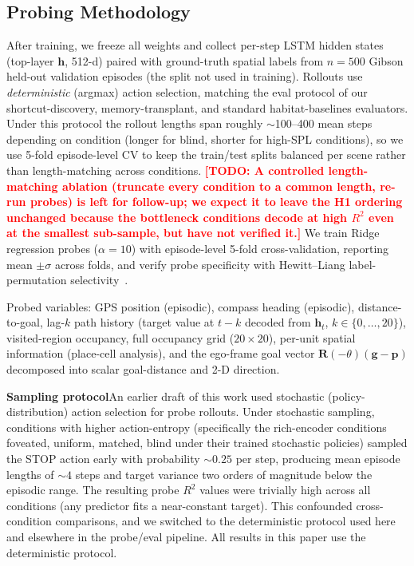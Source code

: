 \documentclass{article}
\newcommand{\TODO}[1]{\textcolor{red}{\textbf{[TODO: #1]}}}
\begin{document}
\subsection{Probing Methodology}
\label{sec:methods-probing}

After training, we freeze all weights and collect per-step LSTM hidden states (top-layer $\mathbf{h}$, 512-d) paired with ground-truth spatial labels from $n{=}500$ Gibson held-out validation episodes (the split not used in training). Rollouts use \emph{deterministic} (argmax) action selection, matching the eval protocol of our shortcut-discovery, memory-transplant, and standard habitat-baselines evaluators. Under this protocol the rollout lengths span roughly $\sim$100--400 mean steps depending on condition (longer for blind, shorter for high-SPL conditions), so we use 5-fold episode-level CV to keep the train/test splits balanced per scene rather than length-matching across conditions. \TODO{A controlled length-matching ablation (truncate every condition to a common length, re-run probes) is left for follow-up; we expect it to leave the H1 ordering unchanged because the bottleneck conditions decode at high $R^2$ even at the smallest sub-sample, but have not verified it.} We train Ridge regression probes ($\alpha=10$) with episode-level 5-fold cross-validation, reporting mean $\pm\sigma$ across folds, and verify probe specificity with Hewitt--Liang label-permutation selectivity~\citep{hewitt2019control}.

Probed variables: GPS position (episodic), compass heading (episodic), distance-to-goal, lag-$k$ path history (target value at $t-k$ decoded from $\mathbf{h}_t$, $k\in\{0,\ldots,20\}$), visited-region occupancy, full occupancy grid ($20\times 20$), per-unit spatial information (place-cell analysis), and the ego-frame goal vector $\mathbf{R}(-\theta)(\mathbf{g}-\mathbf{p})$ decomposed into scalar goal-distance and 2-D direction.

\noindent\textbf{Sampling protocol}\quad An earlier draft of this work used stochastic (policy-distribution) action selection for probe rollouts. Under stochastic sampling, conditions with higher action-entropy (specifically the rich-encoder conditions foveated, uniform, matched, blind under their trained stochastic policies) sampled the STOP action early with probability $\sim\!0.25$ per step, producing mean episode lengths of $\sim\!4$ steps and target variance two orders of magnitude below the episodic range. The resulting probe $R^2$ values were trivially high across all conditions (any predictor fits a near-constant target). This confounded cross-condition comparisons, and we switched to the deterministic protocol used here and elsewhere in the probe/eval pipeline. All results in this paper use the deterministic protocol.
\end{document}
